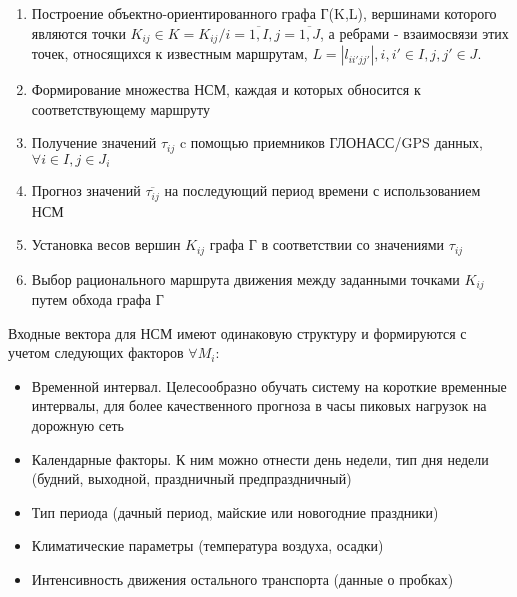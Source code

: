 \documentclass[a4paper,13pt]{article}
\begin{document}
\begin{enumerate}
    \item Построение объектно-ориентированного графа Г(K,L), вершинами которого являются точки \begin{math}K_{ij} \in K = {K_{ij}/i=\overline{1,I}, j=\overline{1,J}}\end{math}, а ребрами - взаимосвязи этих точек, относящихся к известным маршрутам, \begin{math}L = \left | l_{ii'jj'} \right |, i,i' \in I, j,j' \in J \end{math}.
    \item Формирование множества НСМ, каждая и которых обносится к соответствующему маршруту
    \item Получение значений \begin{math}\tau_{ij}\end{math} c помощью приемников ГЛОНАСС/GPS данных, \begin{math}\forall i \in I, j \in J_i \end{math}
    \item Прогноз значений \begin{math}\overline{\tau_{ij}}\end{math} на последующий период времени с использованием НСМ
    \item Установка весов вершин \begin{math}K_{ij}\end{math} графа Г в соответствии со значениями \begin{math}\tau_{ij}\end{math}
    \item Выбор рационального маршрута движения между заданными точками \begin{math}K_{ij}\end{math} путем обхода графа Г 
\end{enumerate}

Входные вектора для НСМ имеют одинаковую структуру и формируются с учетом следующих факторов \begin{math}\forall M_i\end{math}:

\begin{itemize}
    \item Временной интервал. Целесообразно обучать систему на короткие временные интервалы, для более качественного прогноза в часы пиковых нагрузок на дорожную сеть
    \item Календарные факторы. К ним можно отнести день недели, тип дня недели (будний, выходной, праздничный предпраздничный)
    \item Тип периода (дачный период, майские или новогодние праздники)
    \item Климатические параметры (температура воздуха, осадки)
    \item Интенсивность движения остального транспорта (данные о пробках)
\end{itemize}
\end{document}
